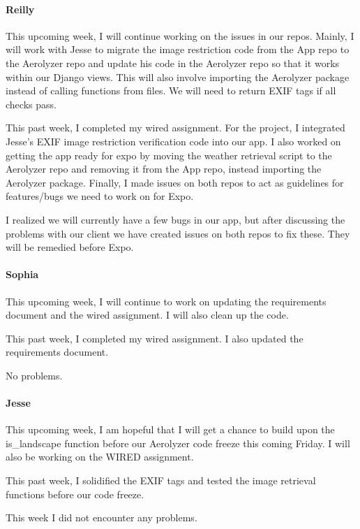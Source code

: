 \documentclass[onecolumn, draftclsnofoot,10pt, compsoc]{IEEEtran}
\begin{document}
\begin{flushleft}
\paragraph{Reilly}
 
This upcoming week, I will continue working on the issues in our repos. Mainly, I will work with Jesse to migrate the image restriction code from the App repo to the Aerolyzer repo and update his code in the Aerolyzer repo so that it works within our Django views. This will also involve importing the Aerolyzer package instead of calling functions from files. We will need to return EXIF tags if all checks pass.
 
 
This past week, I completed my wired assignment. For the project, I integrated Jesse's EXIF image restriction verification code into our app. I also worked on getting the app ready for expo by moving the weather retrieval script to the Aerolyzer repo and removing it from the App repo, instead importing the Aerolyzer package. Finally, I made issues on both repos to act as guidelines for features/bugs we need to work on for Expo.
 
 
I realized we will currently have a few bugs in our app, but after discussing the problems with our client we have created issues on both repos to fix these. They will be remedied before Expo.
 
\paragraph{Sophia}
 
This upcoming week, I will continue to work on updating the requirements document and the wired assignment. I will also clean up the code.
 
 
This past week, I completed my wired assignment. I also updated the requirements document.
 
 
No problems.
 
\paragraph{Jesse}
 
This upcoming week, I am hopeful that I will get a chance to build upon the is\_landscape function before our Aerolyzer code freeze this coming Friday. I will also be working on the WIRED assignment.
 
 
This past week, I solidified the EXIF tags and tested the image retrieval functions before our code freeze.
 
 
This week I did not encounter any problems.
 

\end{flushleft}
\end{document}
